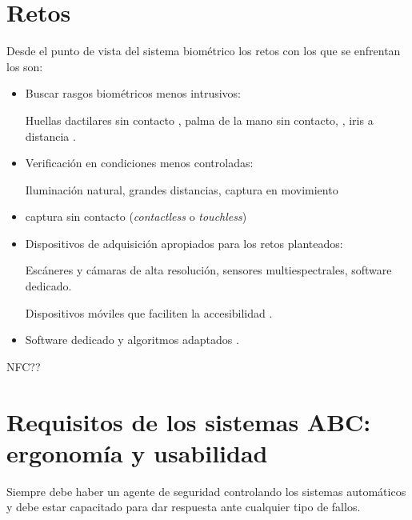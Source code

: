 \section{Retos}\label{sec:RetosABC}

Desde el punto de vista del sistema biométrico los retos con los que se enfrentan los  son:
\begin{itemize}
    \item
    Buscar rasgos biométricos menos intrusivos: 
    
    Huellas dactilares sin contacto\cite{labati2015touchless} \cite{labati2015toward}, palma de la mano sin contacto, \cite{genovese2014touchless}, iris a distancia \cite{matey2006iris}.
    
    \item
    Verificación en condiciones menos controladas:
    
    Iluminación natural, grandes distancias, \gls{captura} en movimiento
    
    \item
    \Gls{captura} sin contacto (\textit{\gls{contactless}} o \textit{\gls{touchless}})
    
    \item
    Dispositivos de adquisición apropiados para los retos planteados:
    
    Escáneres y cámaras de alta resolución, sensores multiespectrales, software dedicado. 
    
    Dispositivos móviles que faciliten la accesibilidad \cite{FastPassOnline}.
    
    \item
    Software dedicado y algoritmos adaptados \cite{abiantun2014sparse}.

\end{itemize}

\color{red}NFC??\color{black}


\section{Requisitos de los sistemas ABC: ergonomía y usabilidad}\label{sec:ErgonomiaABC}

\color{red}

Siempre debe haber un agente de seguridad controlando los sistemas automáticos y debe estar capacitado para dar respuesta ante cualquier tipo de fallos.

